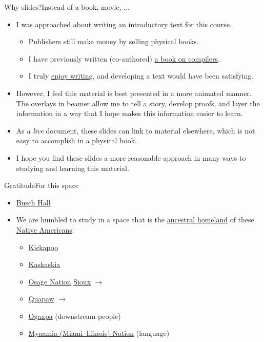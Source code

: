\begin{frame}{Why slides?}{Instead of a book, movie, $\ldots$}
\begin{itemize}
    \item I was approached about writing an introductory text for this course.
    \begin{itemize}
    \item Publishers still make money by selling physical books.
    \item I have previously written (co-authored) \href{https://www.amazon.com/Crafting-Compiler-Charles-N-Fischer/dp/0136067050}{a book on compilers}.
    \item I truly \href{https://www.cse.wustl.edu/~cytron/FAQ/writers.html}{enjoy writing}, and developing a text would have been satisfying.
    \end{itemize}
    \item However, I feel this material is best presented in a more animated manner.  The overlays in beamer allow me to tell a story, develop proofs, and layer the information in a way that I hope makes this information easier to learn.
    \item As a \emph{live} document, these slides can link to material elsewhere, which is not easy to accomplish in a physical book.
    \item I hope you find these slides a more reasonable approach in many ways to studying and learning this material.
\end{itemize}
\end{frame}

\begin{frame}{Gratitude}{For this space}
\begin{itemize}
    \item \href{https://campusnext.wustl.edu/history/}{Busch Hall}
    \item We are humbled to study in a space that is the \href{https://native-land.ca/resources/territory-acknowledgement/}{ancestral homeland} of these \href{https://en.wikipedia.org/wiki/Native_Americans_in_the_United_States}{Native Americans}:
    \begin{itemize}
        \item \href{https://en.wikipedia.org/wiki/Kickapoo_people}{Kickapoo}
        \item \href{https://en.wikipedia.org/wiki/Kaskaskia}{Kaskaskia}
        \item \href{https://en.wikipedia.org/wiki/Osage_Nation}{Osage Nation}
        \href{https://en.wikipedia.org/wiki/Sioux}{Sioux} $\rightarrow$
        \item \Indent{2em}\href{https://en.wikipedia.org/wiki/Quapaw}{Quapaw} $\rightarrow$
        \item \Indent{4em}\href{https://www.quapawtribe.com/401/Tribal-Name}{Ogaxpa} (downstream people)
        \item \href{https://en.wikipedia.org/wiki/Miami_people}{Myaamia (Miami--Illinois) Nation} (language)
        \end{itemize}
\end{itemize}
\end{frame}
